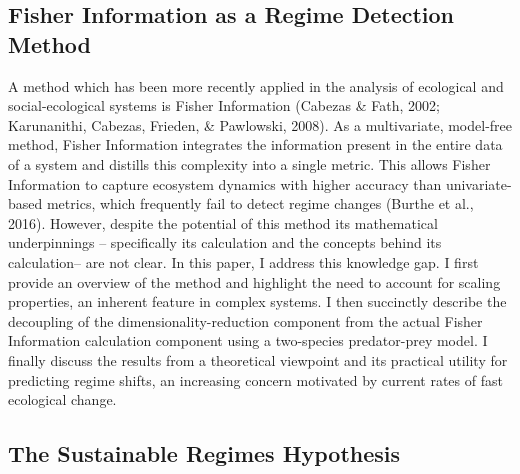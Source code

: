 \documentclass[12pt,twoside,openany]{reedthesis}
\begin{document}
\hypertarget{fisher-information-as-a-regime-detection-method}{%
\subsection{Fisher Information as a Regime Detection Method}\label{fisher-information-as-a-regime-detection-method}}

A method which has been more recently applied in the analysis of ecological and social-ecological systems is Fisher Information (Cabezas \& Fath, 2002; Karunanithi, Cabezas, Frieden, \& Pawlowski, 2008). As a multivariate, model-free method, Fisher Information integrates the information present in the entire data of a system and distills this complexity into a single metric. This allows Fisher Information to capture ecosystem dynamics with higher accuracy than univariate-based metrics, which frequently fail to detect regime changes (Burthe et al., 2016). However, despite the potential of this method its mathematical underpinnings -- specifically its calculation and the concepts behind its calculation-- are not clear. In this paper, I address this knowledge gap. I first provide an overview of the method and highlight the need to account for scaling properties, an inherent feature in complex systems. I then succinctly describe the decoupling of the dimensionality-reduction component from the actual Fisher Information calculation component using a two-species predator-prey model. I finally discuss the results from a theoretical viewpoint and its practical utility for predicting regime shifts, an increasing concern motivated by current rates of fast ecological change.

\hypertarget{the-sustainable-regimes-hypothesis}{%
\subsection{The Sustainable Regimes Hypothesis}\label{the-sustainable-regimes-hypothesis}}
\end{document}
